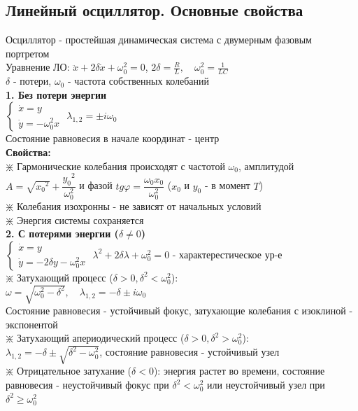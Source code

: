 \begin{multicols*}{2}
		\section{Линейный осциллятор. Основные свойства}
		Осциллятор - простейшая динамическая система с двумерным фазовым портретом\\
		Уравнение ЛО: $\ddot{x} + 2\delta \dot{x} + \omega_0^2 = 0$, \quad $2\delta = \frac{R}{L}, \quad \omega_0^2 = \frac{1}{LC}$\\
		$\delta $ - потери, $\omega_0$ - частота собственных колебаний\\
		\textbf{1. Без потери энергии}\\
		$\begin{cases}
			\dot{x} = y \\
			\dot{y} = -\omega_0^2 x
		\end{cases} $
		\quad \quad $\lambda_{1,2} = \pm i\omega_0$\\
		Состояние равновесия в начале координат - центр\\
		\textbf{Свойства:}\\
		$\divideontimes$ Гармонические колебания происходят с частотой $\omega_0$, амплитудой $A = \sqrt{{x_0}^2} + \dfrac{{y_0}^2}{\omega_0^2}$ и фазой $tg \varphi = \dfrac{\omega_0 x_0}{\omega_0^2}$ ($x_0$ и $y_0$ - в момент $T$)\\
		$\divideontimes$ Колебания изохронны - не зависят от начальных условий\\
		$\divideontimes$ Энергия системы сохраняется\\
		\textbf{2. С потерями энергии ($\delta \neq 0$)}\\
		$\begin{cases}
			\dot{x} = y \\
			\dot{y} = -2\delta y-\omega_0^2 x
		\end{cases} $
		\quad \quad $\lambda^2 + 2\delta \lambda + \omega_0^2 = 0$ - характерестическое ур-е\\
		$\divideontimes$ Затухающий процесс ($\delta > 0, \delta^2 < \omega_0^2$):\\
		$\omega = \sqrt{\omega_0^2 - \delta^2}, \quad \lambda_{1,2} = -\delta \pm i\omega_0$\\
		Состояние равновесия - устойчивый фокус, затухающие колебания с изоклиной - экспонентой\\
		$\divideontimes$ Затухающий апериодический процесс ($\delta > 0, \delta^2 > \omega_0^2$):\\
		$\lambda_{1,2} = -\delta \pm \sqrt{\delta^2 - \omega_0^2}$, состояние равновесия - устойчивый узел\\
		$\divideontimes$ Отрицательное затухание ($\delta<0$): энергия растет во времени, состояние равновесия - неустойчивый фокус при $\delta^2<\omega_0^2$ или неустойчивый узел при $\delta^2\geqslant \omega_0^2$


\end{multicols*}
